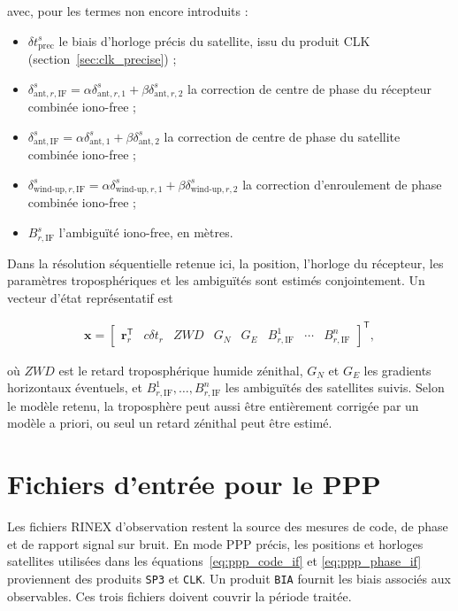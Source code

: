 avec, pour les termes non encore introduits :

\begin{itemize}
    \item $\delta t_{\mathrm{prec}}^s$ le biais d'horloge précis du satellite, issu du produit CLK (section~\ref{sec:clk_precise}) ;
    \item $\delta_{\mathrm{ant},r,\mathrm{IF}}^s=\alpha\delta_{\mathrm{ant},r,1}^s+\beta\delta_{\mathrm{ant},r,2}^s$ la correction de centre de phase du récepteur combinée iono-free ;
    \item $\delta_{\mathrm{ant},\mathrm{IF}}^{s}=\alpha\delta_{\mathrm{ant},1}^{s}+\beta\delta_{\mathrm{ant},2}^{s}$ la correction de centre de phase du satellite combinée iono-free ;
    \item $\delta_{\mathrm{wind\text{-}up},r,\mathrm{IF}}^s=\alpha\delta_{\mathrm{wind\text{-}up},r,1}^s+\beta\delta_{\mathrm{wind\text{-}up},r,2}^s$ la correction d'enroulement de phase combinée iono-free ;
    \item $B_{r,\mathrm{IF}}^s$ l'ambiguïté iono-free, en mètres.
\end{itemize}

Dans la résolution séquentielle retenue ici, la position, l'horloge du récepteur, les
paramètres troposphériques et les ambiguïtés sont estimés conjointement. Un
vecteur d'état représentatif est

\begin{align}
\mathbf x
=
\begin{bmatrix}
\mathbf r_r^{\mathsf T} &
c\delta t_r &
ZWD &
G_N &
G_E &
B_{r,\mathrm{IF}}^1 & \cdots & B_{r,\mathrm{IF}}^n
\end{bmatrix}^{\mathsf T},
\label{eq:ppp_state}
\end{align}

où $ZWD$ est le retard troposphérique humide zénithal, $G_N$ et $G_E$ les
gradients horizontaux éventuels, et
$B_{r,\mathrm{IF}}^1,\ldots,B_{r,\mathrm{IF}}^n$ les ambiguïtés des
satellites suivis. Selon le modèle retenu, la troposphère peut aussi être
entièrement corrigée par un modèle a priori, ou seul un retard zénithal peut
être estimé.

\section{Fichiers d'entrée pour le PPP}

Les fichiers RINEX d'observation restent la source des mesures de code, de
phase et de rapport signal sur bruit. En mode PPP précis, les positions et
horloges satellites utilisées dans les équations~\eqref{eq:ppp_code_if} et
\eqref{eq:ppp_phase_if} proviennent des produits \texttt{SP3} et
\texttt{CLK}. Un produit \texttt{BIA} fournit les biais associés aux
observables. Ces trois fichiers doivent couvrir la période traitée.

